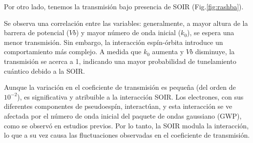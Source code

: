     Por otro lado, tenemos la transmisión bajo presencia de SOIR (Fig.\ref{fig:rashba}).

Se observa una correlación entre las variables: generalmente, a mayor altura de la barrera de potencial ($Vb$) y mayor número de onda inicial ($k_0$), se espera una menor transmisión.
Sin embargo, la interacción espín-órbita introduce un comportamiento más complejo.
A medida que $k_0$ aumenta y $Vb$ disminuye, la transmisión se acerca a 1, indicando una mayor probabilidad de tunelamiento cuántico debido a la SOIR\@.

Aunque la variación en el coeficiente de transmisión es pequeña (del orden de $10^{-2}$), es significativa y atribuible a la interacción SOIR. Los electrones, con sus diferentes componentes de pseudoespín, interactúan, y esta interacción se ve afectada por el número de onda inicial del paquete de ondas gaussiano (GWP), como se observó en estudios previos\cite{Serna2019}.
Por lo tanto, la SOIR modula la interacción, lo que a su vez causa las fluctuaciones observadas en el coeficiente de transmisión.





